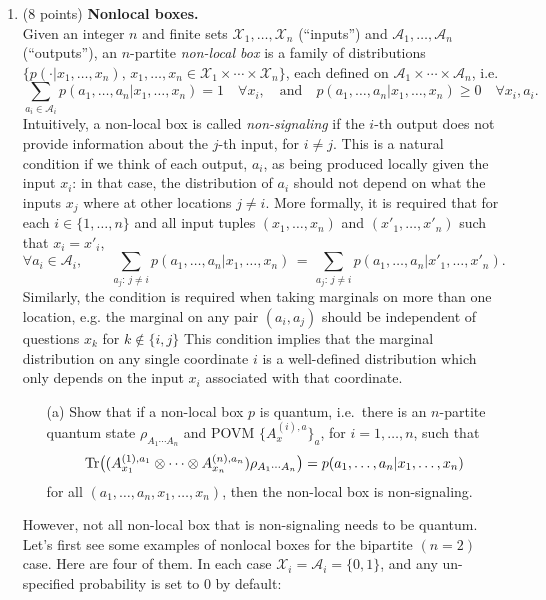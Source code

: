 \documentclass[12pt]{article}
\begin{document}
\begin{enumerate}
\item  {(8 points)} \textbf{Nonlocal boxes.}\\
Given an integer $n$ and finite sets $\mathcal{X}_1,\ldots,\mathcal{X}_n$ (``inputs'') and $\mathcal{A}_1,\ldots,\mathcal{A}_n$ (``outputs''), an $n$-partite \emph{non-local box} is a family of distributions $\{p(\cdot|x_1,\ldots,x_n),\, x_1,\ldots,x_n \in \mathcal{X}_1\times \cdots \times \mathcal{X}_n\}$, each defined on $\mathcal{A}_1\times\cdots\times\mathcal{A}_n$, i.e. 
$$ \sum_{a_i\in\mathcal{A}_i} p(a_1,\ldots,a_n|x_1,\ldots,x_n) =1 \quad\forall x_i, \quad\text{and}\quad p(a_1,\ldots,a_n|x_1,\ldots,x_n) \geq 0\quad \forall x_i,a_i.$$
Intuitively, a non-local box is called \emph{non-signaling} if the $i$-th output does not provide information about the $j$-th input, for $i\neq j$. This is a natural condition if we think of each output, $a_i$, as being produced locally given the input $x_i$: in that case, the distribution of $a_i$ should not depend on what the inputs $x_j$ where at other locations $j\neq i$. 
More formally, it is required that for each $i\in\{1,\ldots,n\}$ and all input tuples $(x_1,\ldots,x_n)$ and $(x'_1,\ldots,x'_n)$ such that $x_i=x'_i$,
$$\forall a_i\in\mathcal{A}_i,\qquad \sum_{a_j:\,j\neq i} p(a_1,\ldots,a_n|x_1,\ldots,x_n) \,=\,  \sum_{a_j:\,j\neq i} p(a_1,\ldots,a_n|x'_1,\ldots,x'_n).$$
Similarly, the condition is required when taking marginals on more than one location, e.g. the marginal on any pair $(a_i,a_j)$ should be independent of questions $x_k$ for $k\notin \{i,j\}$
This condition implies that the marginal distribution on any single coordinate $i$ is a well-defined distribution which only depends on the input $x_i$ associated with that coordinate. 
\begin{enumerate}
\item[(a)] Show that if a non-local box $p$ is quantum, i.e.\ there is an $n$-partite quantum state $\rho_{A_1\cdots A_n}$ and POVM $\{A_x^{(i),a}\}_a$, for $i=1,\ldots,n$, such that 
\[ \mathrm{Tr}\big( (A_{x_1}^{(1),a_1} \otimes \cdots\otimes A_{x_n}^{(n),a_n}) \rho_{A_1\cdots A_n}\big)=p(a_1,\ldots,a_n|x_1,\ldots,x_n)\]
for all $(a_1,\ldots,a_n,x_1,\ldots,x_n)$, then the non-local box is non-signaling.  
\end{enumerate}
However, not all non-local box that is non-signaling needs to be quantum. Let's first see some examples of nonlocal boxes for the bipartite $(n=2)$ case. Here are four of them. In each case $\mathcal{X}_i = \mathcal{A}_i = \{0,1\}$, and any un-specified probability is set to $0$ by default:
\begin{center}

\end{center}
\end{enumerate}
\end{document}
